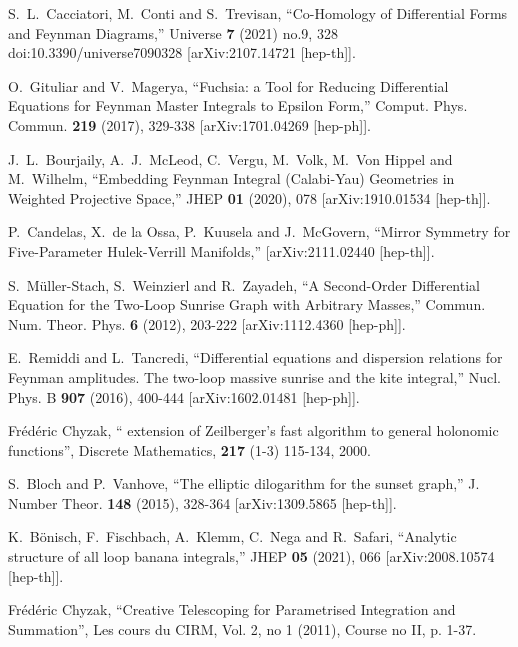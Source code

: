\documentclass[a4paper,12pt]{article}
\numberwithin{equation}{section}
\numberwithin{figure}{section}
\begin{document}
\begin{thebibliography}{99}
S.~L.~Cacciatori, M.~Conti and S.~Trevisan,
``Co-Homology of Differential Forms and Feynman Diagrams,''
Universe \textbf{7} (2021) no.9, 328
doi:10.3390/universe7090328
[arXiv:2107.14721 [hep-th]].
  
O.~Gituliar and V.~Magerya,
``Fuchsia: a Tool for Reducing Differential Equations for Feynman Master Integrals to Epsilon Form,''
Comput. Phys. Commun. \textbf{219} (2017), 329-338
[arXiv:1701.04269 [hep-ph]].

J.~L.~Bourjaily, A.~J.~McLeod, C.~Vergu, M.~Volk, M.~Von Hippel and M.~Wilhelm,
``Embedding Feynman Integral (Calabi-Yau) Geometries in Weighted Projective Space,''
JHEP \textbf{01} (2020), 078
[arXiv:1910.01534 [hep-th]].

P.~Candelas, X.~de la Ossa, P.~Kuusela and J.~McGovern,
``Mirror Symmetry for Five-Parameter Hulek-Verrill Manifolds,''
[arXiv:2111.02440 [hep-th]].

S.~M\"uller-Stach, S.~Weinzierl and R.~Zayadeh,
``A Second-Order Differential Equation for the Two-Loop Sunrise Graph with Arbitrary Masses,''
Commun. Num. Theor. Phys. \textbf{6} (2012), 203-222
[arXiv:1112.4360 [hep-ph]].

E.~Remiddi and L.~Tancredi,
``Differential equations and dispersion relations for Feynman amplitudes. The two-loop massive sunrise and the kite integral,''
Nucl. Phys. B \textbf{907} (2016), 400-444
[arXiv:1602.01481 [hep-ph]].

  Fr\'ed\'eric Chyzak, `` extension of
    Zeilberger's fast algorithm to general holonomic functions'',
Discrete Mathematics, {\bf 217} (1-3) 115-134, 2000.

S.~Bloch and P.~Vanhove,
``The elliptic dilogarithm for the sunset graph,''
J. Number Theor. \textbf{148} (2015), 328-364
[arXiv:1309.5865 [hep-th]].

K.~B\"onisch, F.~Fischbach, A.~Klemm, C.~Nega and R.~Safari,
``Analytic structure of all loop banana integrals,''
JHEP \textbf{05} (2021), 066
[arXiv:2008.10574 [hep-th]].

 Fr\'ed\'eric Chyzak, ``Creative Telescoping for
  Parametrised Integration and Summation'',  Les cours du CIRM,  Vol. 2, no 1 (2011), Course no II, p. 1-37.



\end{thebibliography}
\end{document}
